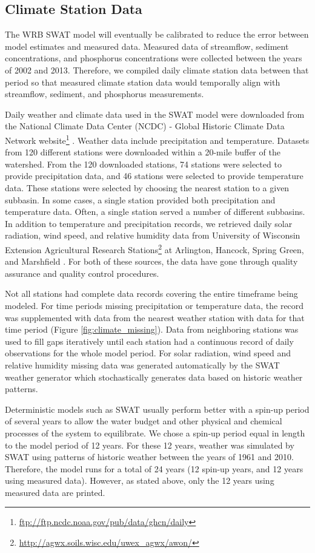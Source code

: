 \subsection{Climate Station Data}\label{sec:climate_data}

The WRB SWAT model will eventually be calibrated to reduce the error between model estimates and measured data. Measured data of streamflow, sediment concentrations, and phosphorus concentrations were collected between the years of 2002 and 2013. Therefore, we compiled daily climate station data between that period so that measured climate station data would temporally align with streamflow, sediment, and phosphorus measurements.

Daily weather and climate data used in the SWAT model were downloaded from the National Climate Data Center (NCDC) - Global Historic Climate Data Network website\footnote{\url{ftp://ftp.ncdc.noaa.gov/pub/data/ghcn/daily}} \citep{ncdc_ghcn_2012}. 
Weather data include precipitation and temperature. Datasets from 120 different stations were downloaded within a 20-mile buffer of the watershed. From the 120 downloaded stations, 74 stations were selected to provide precipitation data, and 46 stations were selected to provide temperature data. These stations were selected by choosing the nearest station to a given subbasin. In some cases, a single station provided both precipitation and temperature data. Often, a single station served a number of different subbasins. In addition to temperature and precipitation records, we retrieved daily solar radiation, wind speed, and relative humidity data from University of Wisconsin Extension Agricultural Research Stations\footnote{\url{http://agwx.soils.wisc.edu/uwex_agwx/awon/}} at Arlington, Hancock, Spring Green, and Marshfield . 
For both of these sources, the data have gone through quality assurance and quality control procedures.

Not all stations had complete data records covering the entire timeframe being modeled.  For time periods missing precipitation or temperature data, the record was supplemented with data from the nearest weather station with data for that time period (Figure \ref{fig:climate_missing}). Data from neighboring stations was used to fill gaps iteratively until each station had a continuous record of daily observations for the whole model period. For solar radiation, wind speed and relative humidity missing data was generated automatically by the SWAT weather generator which stochastically generates data based on historic weather patterns.

Deterministic models such as SWAT usually perform better with a spin-up period of several years to allow the water budget and other physical and chemical processes of the system to equilibrate. We chose a spin-up period equal in length to the model period of 12 years. For these 12 years, weather was simulated by SWAT using patterns of historic weather between the years of 1961 and 2010. Therefore, the model runs for a total of 24 years (12 spin-up years, and 12 years using measured data). However, as stated above, only the 12 years using measured data are printed.
